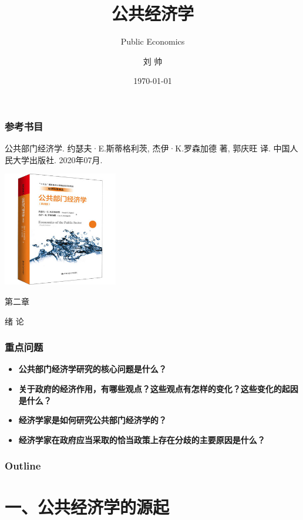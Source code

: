 \documentclass[aspectratio=169, 12pt]{beamer}
\title{公共经济学}
\subtitle{Public Economics}
\author[LIU ShHUAI]{刘 {  } 帅}
\institute{山西师范大学 {  } 经济与管理学院}
\date{\today}
\begin{document}
\maketitle

\begin{frame}[plain]
    \frametitle{参考书目}
    公共部门经济学. 约瑟夫·E.斯蒂格利茨, 杰伊·K.罗森加德 著, 郭庆旺 译. 中国人民大学出版社. 2020年07月.
    \par
    \includegraphics[height=5cm]{./resources/figure/pbook.png}
\end{frame}


\begin{frame}[standout]
    第二章\par
    \addtolength{\parskip}{.4em}
    绪{  }论
\end{frame}

\begin{frame}[plain]
    \frametitle{重点问题}
    \begin{itemize}
        \item \textbf{公共部门经济学研究的核心问题是什么？}
        \item \textbf{关于政府的经济作用，有哪些观点？这些观点有怎样的变化？这些变化的起因是什么？}
        \item \textbf{经济学家是如何研究公共部门经济学的？}
        \item \textbf{经济学家在政府应当采取的恰当政策上存在分歧的主要原因是什么？}
    \end{itemize}
\end{frame}

\begin{frame}[plain]
    \frametitle{Outline}
    \tableofcontents[hideallsubsections]
  \end{frame}

\section{一、公共经济学的源起}
\end{document}
